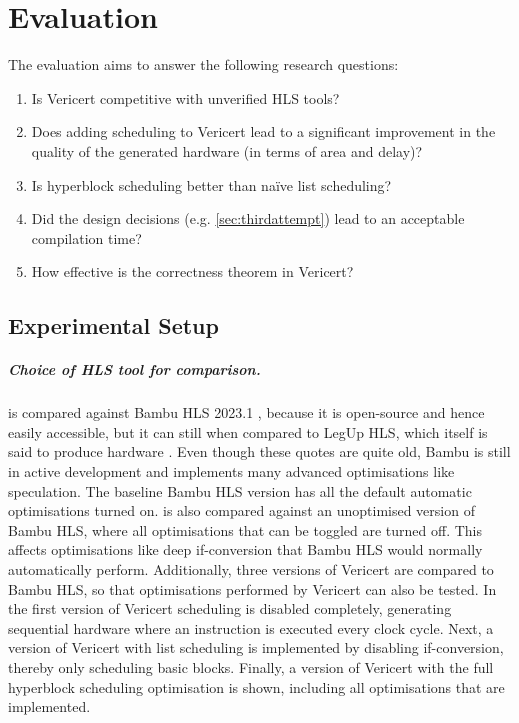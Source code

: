 \graphicspath{{./figures/5-hyperblock-scheduling/}}

\chapter{Evaluation}%
\label{sec:evaluation}%
\label{sec:performance-comparison}

The evaluation aims to answer the following research questions:

\begin{enumerate}[label=\textbf{RQ\arabic*}]
\item Is Vericert competitive with unverified HLS tools?
\item Does adding scheduling to Vericert lead to a significant improvement in
  the quality of the generated hardware (in terms of area and delay)?
\item Is hyperblock scheduling better than na\"ive list scheduling?
\item Did the design decisions (e.g. \cref{sec:thirdattempt}) lead to an
  acceptable compilation time?
\item How effective is the correctness theorem in Vericert?
\end{enumerate}

\section{Experimental Setup}

\def\polybench{PolyBench/C}

\paragraph{Choice of HLS tool for comparison.} \vericert{} is compared against
Bambu HLS 2023.1 \cite{ferrandi21_bambu}, because it is open-source and hence
easily accessible, but it can still
 when compared to LegUp HLS, which itself is said to produce
hardware .  Even though these quotes are quite
old, Bambu is still in active development and implements many advanced
optimisations like speculation.  The baseline Bambu HLS version has all the
default automatic optimisations turned on.  \vericert{} is also compared against
an unoptimised version of Bambu HLS, where all optimisations that can be toggled
are turned off.  This affects optimisations like deep if-conversion that Bambu
HLS would normally automatically perform.  Additionally, three versions of
Vericert are compared to Bambu HLS, so that optimisations performed by Vericert
can also be tested.  In the first version of Vericert scheduling is disabled
completely, generating sequential hardware where an instruction is executed
every clock cycle.  Next, a version of Vericert with list scheduling is
implemented by disabling if-conversion, thereby only scheduling basic blocks.
Finally, a version of Vericert with the full hyperblock scheduling optimisation
is shown, including all optimisations that are implemented.

